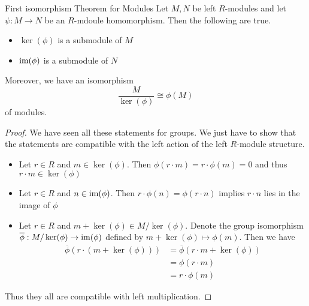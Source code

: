 \documentclass[a4paper]{article}
\begin{document}
\begin{thm}{First isomorphism Theorem for Modules}{} Let $M,N$ be left $R$-modules and let $\psi:M\to N$ be an $R$-mdoule homomorphism. Then the following are true. 
\begin{itemize}
\item $\ker(\phi)$ is a submodule of $M$
\item $\operatorname{im}(\phi)$ is a submodule of $N$
\end{itemize}
Moreover, we have an isomorphism $$\frac{M}{\ker(\phi)}\cong\phi(M)$$ of modules. 
 
\begin{proof}
We have seen all these statements for groups. We just have to show that the statements are compatible with the left action of the left $R$-module structure. 
\begin{itemize}
\item Let $r\in R$ and $m\in\ker(\phi)$. Then $\phi(r\cdot m)=r\cdot\phi(m)=0$ and thus $r\cdot m\in\ker(\phi)$
\item Let $r\in R$ and $n\in\operatorname{im}(\phi)$. Then $r\cdot\phi(n)=\phi(r\cdot n)$ implies $r\cdot n$ lies in the image of $\phi$
\item Let $r\in R$ and $m+\ker(\phi)\in M/\ker(\phi)$. Denote the group isomorphism $\overline{\phi}:M/\ker(\phi)\to\operatorname{im}(\phi)$ defined by $m+\ker(\phi)\mapsto\phi(m)$. Then we have 
\begin{align*}
\overline{\phi}(r\cdot(m+\ker(\phi)))&=\overline{\phi}(r\cdot m+\ker(\phi))\\
&=\phi(r\cdot m)\\
&=r\cdot\phi(m)
\end{align*}
\end{itemize}
Thus they all are compatible with left multiplication. 
\end{proof}
\end{thm}
\end{document}
